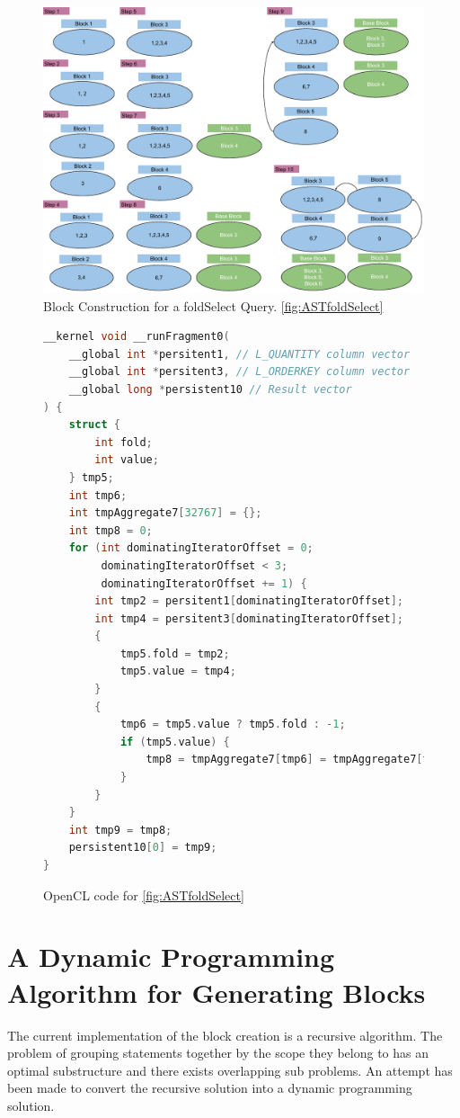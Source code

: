 \begin{figure}[h]
\centering
\includegraphics[width=1\linewidth]{appendix/FragmentConstructionFoldSelect.pdf}
\caption{Block Construction for a foldSelect Query. \ref{fig:ASTfoldSelect}}
\label{fig:fragmentConstructionfoldSelect}
\end{figure}

\begin{figure}
\begin{lstlisting}[frame=single, language=C]
__kernel void __runFragment0(
    __global int *persitent1, // L_QUANTITY column vector
    __global int *persitent3, // L_ORDERKEY column vector
    __global long *persistent10 // Result vector
) {
    struct {
        int fold;
        int value;
    } tmp5;
    int tmp6;
    int tmpAggregate7[32767] = {};
    int tmp8 = 0;
    for (int dominatingIteratorOffset = 0; 
         dominatingIteratorOffset < 3; 
         dominatingIteratorOffset += 1) {
        int tmp2 = persitent1[dominatingIteratorOffset];
        int tmp4 = persitent3[dominatingIteratorOffset];
        {
            tmp5.fold = tmp2;
            tmp5.value = tmp4;
        }
        {
            tmp6 = tmp5.value ? tmp5.fold : -1;
            if (tmp5.value) {
                tmp8 = tmpAggregate7[tmp6] = tmpAggregate7[tmp6] + tmp6;
            }
        }
    }
    int tmp9 = tmp8;
    persistent10[0] = tmp9;
}
\end{lstlisting}
    \caption{OpenCL code for \ref{fig:ASTfoldSelect}}
    \label{fig:openclCodeFoldSelect}
\end{figure}

\chapter{A Dynamic Programming Algorithm for Generating Blocks}
\label{appendix:dpalgo}
The current implementation of the block creation is a recursive algorithm. The problem of grouping statements together by the scope they belong to has an optimal substructure and there exists overlapping sub problems. An attempt has been made to convert the recursive solution into a dynamic programming solution.

